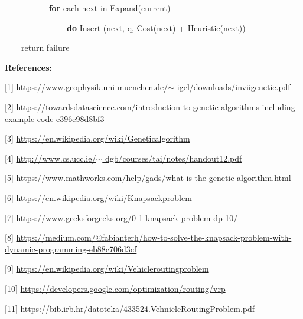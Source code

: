\documentclass[12pt]{article}
\renewcommand{\_}{\kern-1.5pt\textunderscore\kern-1.5pt}
\begin{document}
\ \ \ \ \ \ \ \ \ \  \textbf{ for} each next in Expand(current)\par

\ \ \ \ \ \ \ \ \ \ \ \ \ \ \  \textbf{do} Insert (next, q, Cost(next) + Heuristic(next))\par

\ \ \ \  return failure\par

\setlength{\parskip}{8.04pt}
\textbf{References:}\par

[1] \href{https://www.geophysik.uni-muenchen.de/~igel/downloads/inviigenetic.pdf}{https://www.geophysik.uni-muenchen.de/$ \sim $ igel/downloads/inviigenetic.pdf}\par

[2] \href{https://towardsdatascience.com/introduction-to-genetic-algorithms-including-example-code-e396e98d8bf3}{https://towardsdatascience.com/introduction-to-genetic-algorithms-including-example-code-e396e98d8bf3}\par

[3] \href{https://en.wikipedia.org/wiki/Genetic_algorithm}{https://en.wikipedia.org/wiki/Genetic\_algorithm}\par

[4] \href{http://www.cs.ucc.ie/~dgb/courses/tai/notes/handout12.pdf}{http://www.cs.ucc.ie/$ \sim $ dgb/courses/tai/notes/handout12.pdf}\par

[5] \href{https://www.mathworks.com/help/gads/what-is-the-genetic-algorithm.html}{https://www.mathworks.com/help/gads/what-is-the-genetic-algorithm.html}\par

[6] \href{https://en.wikipedia.org/wiki/Knapsack_problem}{https://en.wikipedia.org/wiki/Knapsack\_problem}\par

[7] \href{https://www.geeksforgeeks.org/0-1-knapsack-problem-dp-10/}{https://www.geeksforgeeks.org/0-1-knapsack-problem-dp-10/}\par

[8] \href{https://medium.com/@fabianterh/how-to-solve-the-knapsack-problem-with-dynamic-programming-eb88c706d3cf}{https://medium.com/@fabianterh/how-to-solve-the-knapsack-problem-with-dynamic-programming-eb88c706d3cf}\par

[9] \href{https://en.wikipedia.org/wiki/Vehicle_routing_problem}{https://en.wikipedia.org/wiki/Vehicle\_routing\_problem}\par

[10] \href{https://developers.google.com/optimization/routing/vrp}{https://developers.google.com/optimization/routing/vrp}\par

[11] \href{https://bib.irb.hr/datoteka/433524.Vehnicle_Routing_Problem.pdf}{https://bib.irb.hr/datoteka/433524.Vehnicle\_Routing\_Problem.pdf}\par


\vspace{\baselineskip}

\vspace{\baselineskip}

\printbibliography
\end{document}
